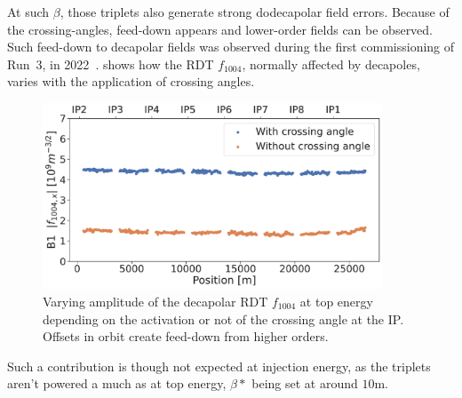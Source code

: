 At such $\beta$, those triplets also generate strong dodecapolar field errors. Because of the
crossing-angles, feed-down appears and lower-order fields can be observed.
Such feed-down to decapolar fields was observed during the first commissioning of Run~3, in
2022~\cite{maclean_prospects_2022}.
 shows how the RDT $f_{1004}$, normally affected by
decapoles, varies with the application of crossing angles.

\begin{figure}[!htb]
    \centering
    \includegraphics[width=0.9\textwidth]{./images/f1004x_feed-down_b6_triplets.pdf}
    \caption{Varying amplitude of the decapolar RDT $f_{1004}$ at top energy depending on the
    activation or not of the crossing angle at the IP. Offsets in orbit create feed-down from higher
    orders.}
    \label{fig:decapoles:f1004_from_feeddown}
\end{figure}

Such a contribution is though not expected at injection energy, as the triplets aren't powered a
much as at top energy, $\beta*$ being set at around $10$m.